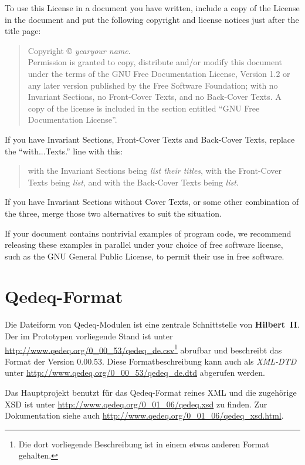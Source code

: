 \documentclass[a4paper,german,10pt,twoside]{book}
\begin{document}
{\begin{appendix}
{To use this License in a document you have written, include a copy of the License in the document
and put the following copyright and license notices just after the title page:
\begin{quote}
	Copyright \copyright{} \textit{year}\quad \textit{your name}.\\
	Permission is granted to copy, distribute and/or modify this document
	under the terms of the GNU Free Documentation License, Version 1.2
	or any later version published by the Free Software Foundation;
	with no Invariant Sections, no Front-Cover Texts, and no Back-Cover Texts.
	A copy of the license is included in the section entitled ``GNU
	Free Documentation License''.
\end{quote}
If you have Invariant Sections, Front-Cover Texts and Back-Cover Texts, replace the
``with...Texts.'' line with this:
\begin{quote}
	with the Invariant Sections being \textit{list their titles}, with the
	Front-Cover Texts being \textit{list}, and with the Back-Cover Texts being \textit{list}.
\end{quote}
If you have Invariant Sections without Cover Texts, or some other combination of the three, merge
those two alternatives to suit the situation.

If your document contains nontrivial examples of program code, we recommend releasing these
examples in parallel under your choice of free software license, such as the GNU General Public
License, to permit their use in free software.
\par
} %


\chapter{Qedeq-Format} \label{Qedeq-Format}

Die Dateiform von Qedeq-Modulen ist eine zentrale Schnittstelle von \textbf{Hilbert~II}. Der im
Prototypen vorliegende Stand ist unter \url{http://www.qedeq.org/0_00_53/qedeq_de.csv}\footnote{Die
dort vorliegende Beschreibung ist in einem etwas anderen Format gehalten.} abrufbar und beschreibt
das Format der Version 0.00.53. Diese Formatbeschreibung kann auch als \emph{XML-DTD} unter
\url{http://www.qedeq.org/0_00_53/qedeq_de.dtd} abgerufen werden.
\par
Das Hauptprojekt benutzt f{\"u}r das Qedeq-Format reines XML und die zugeh{\"o}rige XSD ist unter
\url{http://www.qedeq.org/0_01_06/qedeq.xsd} zu finden. Zur Dokumentation siehe auch
\url{http://www.qedeq.org/0_01_06/qedeq_xsd.html}.


\end{appendix}}
\end{document}
